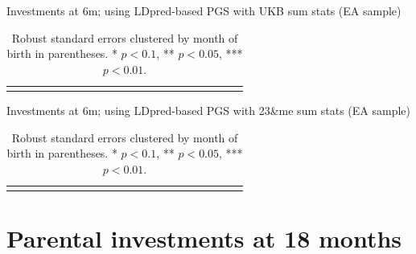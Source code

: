 \documentclass{article}
\begin{document}
\begin{table}[H]
\caption{Investments at 6m; using LDpred-based PGS with UKB sum stats (EA sample)}
\centering
{\scriptsize
\begin{tabular}{lcccccccccccccccccccc}
\toprule

\bottomrule
\addlinespace[.75ex]
\end{tabular}
}
\caption*{\noindent\scriptsize Robust standard errors clustered by month of birth in parentheses. * $p < 0.1$, ** $p < 0.05$, *** $p < 0.01$.}
\end{table}

%


\begin{table}[H]
\caption{Investments at 6m; using LDpred-based PGS with 23\&me sum stats (EA sample)}
\centering
{\scriptsize
\begin{tabular}{lcccccccccccccccccccc}
\toprule

\bottomrule
\addlinespace[.75ex]
\end{tabular}
}
\caption*{\noindent\scriptsize Robust standard errors clustered by month of birth in parentheses. * $p < 0.1$, ** $p < 0.05$, *** $p < 0.01$.}
\end{table}

%

\clearpage


\section{Parental investments at 18 months}
\end{document}
